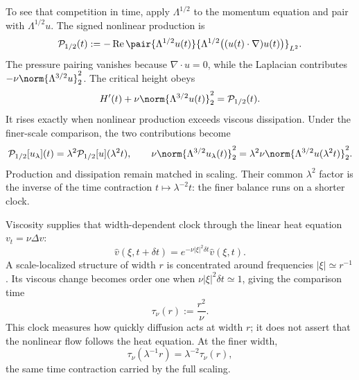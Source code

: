 
To see that competition in time, apply \(\Lambda^{1/2}\) to the momentum equation and pair with \(\Lambda^{1/2}u\).
The signed nonlinear production is
\[
  \mathcal P_{1/2}(t)
  :=
  -\operatorname{Re}
  \pair
    {\Lambda^{1/2}u(t)}
    {\Lambda^{1/2}\bigl((u(t)\cdot\nabla)u(t)\bigr)}_{L^2}.
\]
The pressure pairing vanishes because \(\nabla\cdot u=0\), while the Laplacian contributes \(-\nu\norm{\Lambda^{3/2}u}_2^2\).
The critical height obeys
\[
  H'(t)
  +
  \nu\norm{\Lambda^{3/2}u(t)}_2^2
  =
  \mathcal P_{1/2}(t).
\]
It rises exactly when nonlinear production exceeds viscous dissipation.
Under the finer-scale comparison, the two contributions become
\[
  \mathcal P_{1/2}[u_\lambda](t)
  =
  \lambda^2\mathcal P_{1/2}[u](\lambda^2t),
  \qquad
  \nu\norm{\Lambda^{3/2}u_\lambda(t)}_2^2
  =
  \lambda^2\nu\norm{\Lambda^{3/2}u(\lambda^2t)}_2^2.
\]
Production and dissipation remain matched in scaling.
Their common \(\lambda^2\) factor is the inverse of the time contraction \(t\mapsto\lambda^{-2}t\): the finer balance runs on a shorter clock.


Viscosity supplies that width-dependent clock through the linear heat equation \(v_t=\nu\Delta v\):
\[
  \widehat v(\xi,t+\delta t)
  =
  e^{-\nu|\xi|^2\delta t}\widehat v(\xi,t).
\]
A scale-localized structure of width \(r\) is concentrated around frequencies \(|\xi|\simeq r^{-1}\).
Its viscous change becomes order one when \(\nu|\xi|^2\delta t\simeq1\), giving the comparison time
\[
  \tau_\nu(r)
  :=
  \frac{r^2}{\nu}.
\]
This clock measures how quickly diffusion acts at width \(r\); it does not assert that the nonlinear flow follows the heat equation.
At the finer width,
\[
  \tau_\nu(\lambda^{-1}r)
  =
  \lambda^{-2}\tau_\nu(r),
\]
the same time contraction carried by the full \NavierStokes{} scaling.


